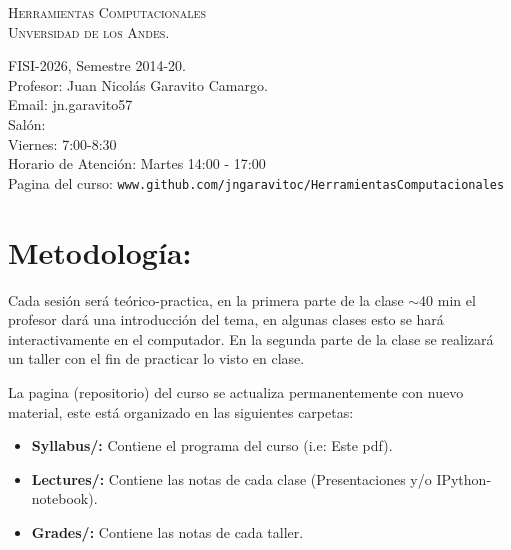 \documentclass[letterpaper]{article}
\begin{document}
\begin{center}
\textsc{\LARGE Herramientas Computacionales}\\
\textsc{\large Unversidad de los Andes.}\\
\end{center}
\large{FISI-2026, Semestre 2014-20.}\\
\large{Profesor: Juan Nicol\'as Garavito Camargo.}\\
\large{Email: jn.garavito57}\\
\large{Sal\'on:}\\
\large{Viernes: 7:00-8:30}\\
\large{Horario de Atenci\'on: Martes 14:00 - 17:00}\\
\large{Pagina del curso: \verb"www.github.com/jngaravitoc/HerramientasComputacionales"}

\section*{Metodolog\'ia:}

Cada sesi\'on ser\'a te\'orico-practica, en la primera parte de la clase $\sim 40$ min el profesor 
dar\'a una introducci\'on del tema, en algunas clases esto se har\'a interactivamente en el computador. 
En la segunda parte de la clase se realizar\'a un taller con el fin de practicar
lo visto en clase.

La pagina (repositorio) del curso se actualiza permanentemente con nuevo material, este est\'a organizado en las siguientes carpetas:\\

\begin{itemize}
\item \textbf{Syllabus/:} Contiene el programa del curso (i.e: Este pdf).
\item \textbf{Lectures/:} Contiene las notas de cada clase (Presentaciones y/o IPython-notebook).
\item \textbf{Grades/:} Contiene las notas de cada taller.
\end{itemize}
 
 
\end{document}
